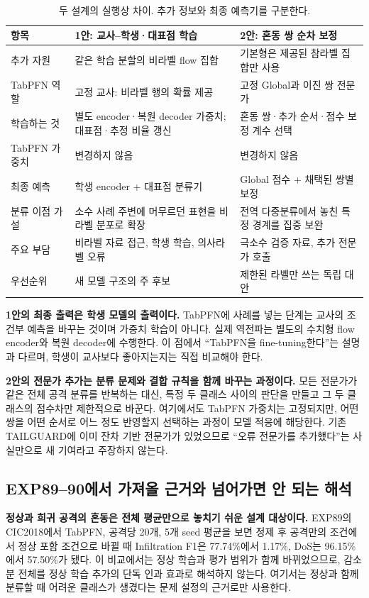 \begin{table}[H]\centering\small
\caption{두 설계의 실행상 차이. 추가 정보와 최종 예측기를 구분한다.}
\begin{tabularx}{\linewidth}{p{.16\linewidth}YY}
\toprule
항목 & 1안: 교사--학생·대표점 학습 & 2안: 혼동 쌍 순차 보정\\\midrule
추가 자원 & 같은 학습 분할의 비라벨 flow 집합 & 기본형은 제공된 참라벨 집합만 사용\\
TabPFN 역할 & 고정 교사: 비라벨 행의 확률 제공 & 고정 Global과 이진 쌍 전문가\\
학습하는 것 & 별도 encoder·복원 decoder 가중치; 대표점·추정 비율 갱신 & 혼동 쌍·추가 순서·점수 보정 계수 선택\\
TabPFN 가중치 & 변경하지 않음 & 변경하지 않음\\
최종 예측 & 학생 encoder + 대표점 분류기 & Global 점수 + 채택된 쌍별 보정\\
분류 이점 가설 & 소수 사례 주변에 머무르던 표현을 비라벨 분포로 확장 & 전역 다중분류에서 놓친 특정 경계를 집중 보완\\
주요 부담 & 비라벨 자료 접근, 학생 학습, 의사라벨 오류 & 극소수 검증 자료, 추가 전문가 호출\\
우선순위 & 새 모델 구조의 주 후보 & 제한된 라벨만 쓰는 독립 대안\\\bottomrule
\end{tabularx}
\end{table}

\textbf{1안의 최종 출력은 학생 모델의 출력이다.} TabPFN에 사례를 넣는 단계는 교사의 조건부 예측을 바꾸는 것이며 가중치 학습이 아니다. 실제 역전파는 별도의 수치형 flow encoder와 복원 decoder에 수행한다. 이 점에서 ``TabPFN을 fine-tuning한다''는 설명과 다르며, 학생이 교사보다 좋아지는지는 직접 비교해야 한다.

\textbf{2안의 전문가 추가는 분류 문제와 결합 규칙을 함께 바꾸는 과정이다.} 모든 전문가가 같은 전체 공격 분류를 반복하는 대신, 특정 두 클래스 사이의 판단을 만들고 그 두 클래스의 점수차만 제한적으로 바꾼다. 여기에서도 TabPFN 가중치는 고정되지만, 어떤 쌍을 어떤 순서로 어느 정도 반영할지 선택하는 과정이 모델 적응에 해당한다. 기존 TAILGUARD에 이미 잔차 기반 전문가가 있었으므로 ``오류 전문가를 추가했다''는 사실만으로 새 기여라고 주장하지 않는다.

\subsection{EXP89--90에서 가져올 근거와 넘어가면 안 되는 해석}
\textbf{정상과 희귀 공격의 혼동은 전체 평균만으로 놓치기 쉬운 설계 대상이다.} EXP89의 CIC2018에서 TabPFN, 공격당 20개, 5개 seed 평균을 보면 정제 후 공격만의 조건에서 정상 포함 조건으로 바뀔 때 Infiltration F1은 77.74\%에서 1.17\%, DoS는 96.15\%에서 57.50\%가 됐다. 이 비교에서는 정상 학습과 평가 범위가 함께 바뀌었으므로, 감소분 전체를 정상 학습 추가의 단독 인과 효과로 해석하지 않는다. 여기서는 정상과 함께 분류할 때 어려운 클래스가 생겼다는 문제 설정의 근거로만 사용한다.

